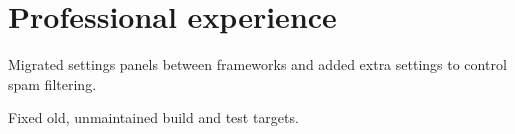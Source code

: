 \documentclass{article}
\begin{document}
\maketitle







\section{Professional experience}

\begin{job}[company=Google,
	city={Mountain View, \textsc{ca}},
	dates=June 2019--August 2019,
	title=Software Engineer Intern,
	]
\item Migrated settings panels between frameworks and added extra settings
to control spam filtering.
\item Fixed old, unmaintained build and test targets.
\end{job}
\end{document}

